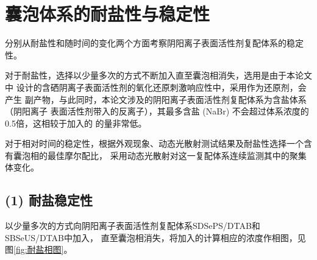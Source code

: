 \documentclass[bachelor,fandolfonts,replaceperiod]{jnuthesis}
\begin{document}
    \section{囊泡体系的耐盐性与稳定性}
    分别从耐盐性和随时间的变化两个方面考察阴阳离子表面活性剂复配体系的稳定性。
    
    对于耐盐性，选择以少量多次的方式不断加入直至囊泡相消失，选用是由于本论文中
    设计的含硒阴离子表面活性剂的氧化还原刺激响应性中，采用作为还原剂，会产生
    副产物，与此同时，本论文涉及的阴阳离子表面活性剂复配体系为含盐体系（阴阳离子
    表面活性剂带入的反离子），其最多含盐 (NaBr) 不会超过体系浓度的0.5倍，这相较于加入的
    的量非常低。
    
    对于相对时间的稳定性，根据外观现象、动态光散射测试结果及耐盐性选择一个含有囊泡相的最佳摩尔配比，
    采用动态光散射对这一复配体系连续监测其中的聚集体变化。
    
    \subsection*{(1) 耐盐稳定性}
    以少量多次的方式向阴阳离子表面活性剂复配体系SDSePS/DTAB和SBSeUS/DTAB中加入，
    直至囊泡相消失，将加入的计算相应的浓度作相图，见图\ref{fig:耐盐相图}。
\end{document}
